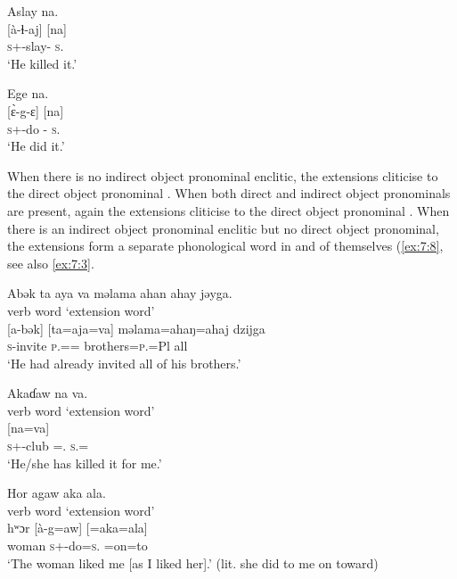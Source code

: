 \ea\label{ex:7:4}
Aslay na.\\
\gll {}[à-ɬ{}-aj] \hspace{35pt}   [na]\\
\textsc{s}+{\PFV}-slay-{\CL} {} \textsc{s}.{\DO}\\
\glt ‘He killed it.’
\z

\ea\label{ex:7:5}
Ege   na.\\
\gll {}[\`ɛ-g-ɛ]  \hspace{45pt}  [na]\\
\textsc{s}+{\PFV}-do -{\CL}{} \textsc{s}.{\DO}\\
\glt ‘He did it.’
\z

 When there is no  indirect object pronominal enclitic, the extensions cliticise to the direct object pronominal . When both direct and indirect object pronominals are present, again the extensions cliticise to the direct object pronominal  . When there is an indirect object pronominal enclitic but no direct object pronominal, the extensions form a separate phonological word in and of themselves (\ref{ex:7:8}, see also \ref{ex:7:3}. 

\ea\label{ex:7:6}
Abək  ta  aya  va  məlama  ahan  ahay  jəyga.\\
 verb word \hspace{9pt} ‘extension word’\\
\gll {}[a-bək] \hspace{15pt}  [ta=aja=va]  \hspace{10pt}  məlama=ahaŋ=ahaj  dzijga\\
\textsc{s}-invite \hspace{15pt}  \textsc{p}.{\DO}={\PLU}={\PRF} {}  brothers=\textsc{p}.{\POSS}=Pl  all\\
\glt ‘He had already invited all of his brothers.’  
\z

\ea\label{ex:7:7}
Akaɗaw  na  va. \\
verb word  \hspace{36pt}        ‘extension word’\\
\gll\relax [à-kaɗ=aw]  {}  [na=va]\\
\textsc{s}+{\PFV}-club ={\oneS}.{\IO}    \textsc{s}.{\DO}={\PRF}\\
\glt ‘He/she has killed it for me.’ 
\z

\ea\label{ex:7:8}
Hor  agaw  aka  ala.\\
\hspace{30pt} verb word \hspace{28pt} ‘extension word’\\
\gll hʷɔr    [à-g=aw]     [=aka=ala]\\
woman  \textsc{s}+{\PFV}-do=\textsc{s}.{\IO}   =on=to\\
\glt ‘The woman liked me [as I liked her].’ (lit. she did to me on toward)  
\z


